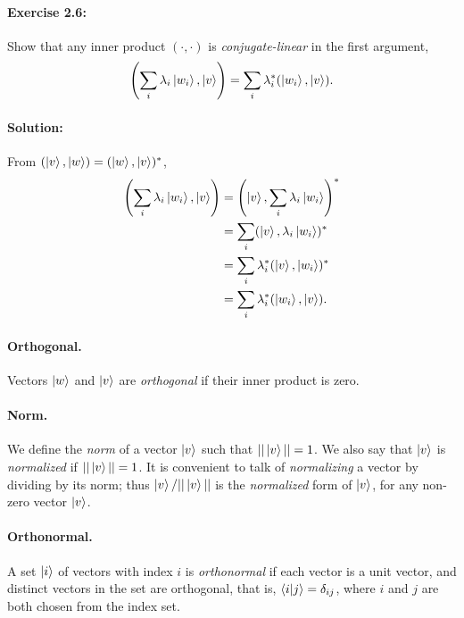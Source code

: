\documentclass{article}
\begin{document}
\paragraph{\cite{mikeandike} Exercise 2.6:} Show that any inner product
$(\cdot, \cdot)$ is \emph{conjugate-linear} in the first argument,
\begin{equation}
  \left(\sum_i \lambda_i\ket{w_i}, \ket{v}\right)
    = \sum_i \lambda_i^*(\ket{w_i}, \ket{v}). \label{eq:conj-lin}
\end{equation}

\paragraph{Solution:} From $(\ket{v}, \ket{w}) = (\ket{w}, \ket{v})^*$,
\begin{align*}
  \left(\sum_i \lambda_i\ket{w_i}, \ket{v}\right)
    &= \left(\ket{v}, \sum_i \lambda_i\ket{w_i}\right)^* \\
    &= \sum_i (\ket{v}, \lambda_i\ket{w_i})^* \\
    &= \sum_i \lambda_i^* (\ket{v}, \ket{w_i})^* \\
    &= \sum_i \lambda_i^*(\ket{w_i}, \ket{v}).
\end{align*}

\paragraph{Orthogonal.} Vectors $\ket{w}$ and $\ket{v}$ are \emph{orthogonal}
if their inner product is zero.

\paragraph{Norm.} We define the \emph{norm} of a vector $\ket{v}$ such that
$||\ket{v}|| = 1$. We also say that $\ket{v}$ is \emph{normalized} if
$||\ket{v}|| = 1$. It is convenient to talk of \emph{normalizing} a vector by
dividing by its norm; thus $\ket{v}/||\ket{v}||$ is the \emph{normalized} form
of $\ket{v}$, for any non-zero vector $\ket{v}$.

\paragraph{Orthonormal.} A set $\ket{i}$ of vectors with index $i$ is
\emph{orthonormal} if each vector is a unit vector, and distinct vectors in the
set are orthogonal, that is, $\braket{i}{j} = \delta_{ij}$, where $i$ and $j$
are both chosen from the index set.
\end{document}

